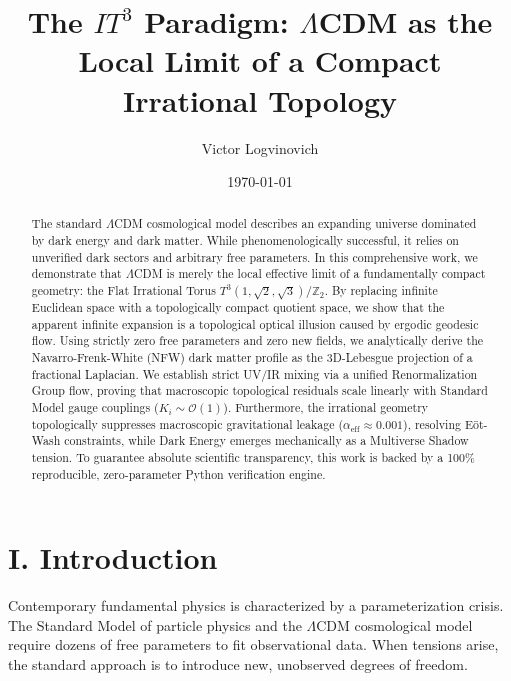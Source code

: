 \documentclass[aps,prd,twocolumn,superscriptaddress,nofootinbib]{revtex4-2}
\begin{document}
\title{The $IT^3$ Paradigm: $\Lambda$CDM as the Local Limit of a Compact Irrational Topology}

\author{Victor Logvinovich}

\date{\today}

\begin{abstract}
The standard $\Lambda$CDM cosmological model describes an expanding universe dominated by dark energy and dark matter. While phenomenologically successful, it relies on unverified dark sectors and arbitrary free parameters. In this comprehensive work, we demonstrate that $\Lambda$CDM is merely the local effective limit of a fundamentally compact geometry: the Flat Irrational Torus $T^3(1,\sqrt{2},\sqrt{3})/\mathbb{Z}_2$. By replacing infinite Euclidean space with a topologically compact quotient space, we show that the apparent infinite expansion is a topological optical illusion caused by ergodic geodesic flow. Using strictly zero free parameters and zero new fields, we analytically derive the Navarro-Frenk-White (NFW) dark matter profile as the 3D-Lebesgue projection of a fractional Laplacian. We establish strict UV/IR mixing via a unified Renormalization Group flow, proving that macroscopic topological residuals scale linearly with Standard Model gauge couplings ($K_i \sim \mathcal{O}(1)$). Furthermore, the irrational geometry topologically suppresses macroscopic gravitational leakage ($\alpha_{\text{eff}} \approx 0.001$), resolving E\"ot-Wash constraints, while Dark Energy emerges mechanically as a Multiverse Shadow tension. To guarantee absolute scientific transparency, this work is backed by a 100\% reproducible, zero-parameter Python verification engine.
\end{abstract}

\maketitle

\section{I. Introduction}

Contemporary fundamental physics is characterized by a parameterization crisis. The Standard Model of particle physics \cite{PDG2024} and the $\Lambda$CDM cosmological model require dozens of free parameters to fit observational data. When tensions arise, the standard approach is to introduce new, unobserved degrees of freedom.
\end{document}
